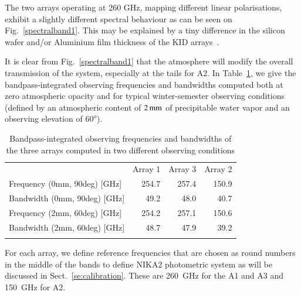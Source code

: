 The two arrays operating at 260 GHz, mapping different linear polarisations,
exhibit a slightly different spectral behaviour as can be
seen on Fig.~\ref{spectralband1}. This may be explained by a tiny
difference in the silicon wafer and/or Aluminium film
thickness of the KID arrays~\citep{Adam2018}.

It is clear from Fig.~\ref{spectralband1} that the atmosphere will
modify the overall transmission of the system, especially at the tails
for A2. In Table~\ref{tab:frequencies}, we give the bandpass-integrated
observing frequencies and bandwidths computed both at zero atmospheric
opacity and for typical winter-semester observing conditions
(defined by an atmospheric content of $2\,\rm{mm}$ of precipitable
water vapor and an observing elevation of $60^o$).

\begin{table}[!htbp]
  \caption[]{Bandpass-integrated observing frequencies and bandwidths
    of the three arrays computed in two different observing conditions}
  \label{tab:frequencies}
  \centering    
  \begin{tabular}{lrrr}
    \hline\hline
    \noalign{\smallskip}
    & Array 1 & Array 3 & Array 2 \\
    \noalign{\smallskip}
    \hline
    \noalign{\smallskip}
    Frequency \small{(0mm, 90deg)} [GHz] & 254.7 & 257.4 &  150.9 \\
    Bandwidth \small{(0mm, 90deg)} [GHz] &  49.2 & 48.0  &   40.7 \\
    Frequency \small{(2mm, 60deg)} [GHz] & 254.2 & 257.1 &  150.6 \\
    Bandwidth \small{(2mm, 60deg)} [GHz] &  48.7 &  47.9 &    39.2 \\
    \noalign{\smallskip}
    \hline
  \end{tabular}
\end{table}
For each array, we define reference frequencies that are chosen
as round numbers in the middle of the bands to define NIKA2
photometric system as will be discussed in
Sect.~\ref{se:calibration}. These are 260~GHz for the A1 and A3 and
150~GHz for A2.
